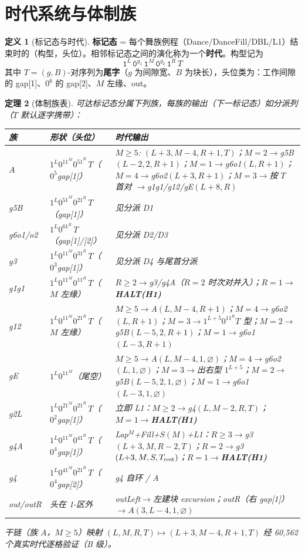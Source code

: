 \documentclass[11pt]{ctexart}
\newtheorem{theorem}{定理}[section]
\theoremstyle{definition}
\newtheorem{definition}[theorem]{定义}
\begin{document}
\section{时代系统与体制族}

\begin{definition}[标记态与时代]\label{def:era}
\textbf{标记态} = 每个舞族例程（Dance/DanceFill/DBL/L1）结束时的（构型，头位）。相邻标记态之间的演化称为一个\textbf{时代}。构型记为
\[
\texttt{1}^{L}\,\texttt{0}^{g_1}\,\texttt{1}^{M}\,\texttt{0}^{g_2}\,\texttt{1}^{R}\,T
\]
其中 $T=(g,B)$-对序列为\textbf{尾字}（$g$ 为间隙宽、$B$ 为块长），头位类为：工作间隙的 gap[1]、$0^6$ 的 gap[2]、$M$ 左缘、out。
\end{definition}

\begin{theorem}[体制族表]\label{thm:regime}
可达标记态分属下列族，每族的输出（下一标记态）如分派列（$T$ 默认逐字携带）：

\begin{center}\small
\begin{tabular}{llp{8.6cm}}
\toprule
族 & 形状（头位） & 时代输出\\
\midrule
$A$ & $1^L0^11^M0^51^R\,T$（$0^5$gap[1]） & $M\ge5$: $(L{+}3,M{-}4,R{+}1,T)$；$M{=}2\to$g5B$(L{-}2,2,R{+}1)$；$M{=}1\to$g6o1$(L,R{+}1)$；$M{=}4\to$g6o2$(L{+}3,R{+}1)$；$M{=}3\to$按 $T$ 首对 $\to$g1g1/g12/gE$(L{+}8,R)$\\
g5B & $1^L0^51^M0^21^R\,T$（gap[1]） & 见分派 D1\\
g6o1/o2 & $1^L0^61^R\,T$（gap[1]/[2]） & 见分派 D2/D3\\
g3 & $1^L0^11^M0^31^R\,T$（$0^3$gap[1]） & 见分派 D4 与尾首分派\\
g1g1 & $1^L0^11^M0^11^R\,T$（$M$ 左缘） & $R\ge2\to$g3/g4A（$R{=}2$ 时次对并入）；$R{=}1\to$\textbf{HALT(H1)}\\
g12 & $1^L0^11^M0^21^R\,T$（$M$ 左缘） & $M\ge5\to$A$(L,M{-}4,R{+}1)$；$M{=}4\to$g6o2$(L,R{+}1)$；$M{=}3\to$$1^{L+5}0^11^RT$ 型；$M{=}2\to$g5B$(L{-}5,2,R{+}1)$；$M{=}1\to$g6o1$(L{-}3,R{+}1)$\\
gE & $1^L0^11^M$（尾空） & $M\ge5\to$A$(L,M{-}4,1,\varnothing)$；$M{=}4\to$g6o2$(L,1,\varnothing)$；$M{=}3\to$出右型 $1^{L+5}$；$M{=}2\to$g5B$(L{-}5,2,1,\varnothing)$；$M{=}1\to$g6o1$(L{-}3,1,\varnothing)$\\
g2L & $1^L0^21^M0^21^R\,T$（$0^2$gap[1]） & 立即 L1：$M\ge2\to$g4$(L,M{-}2,R,T)$；$M{=}1\to$\textbf{HALT(H1)}\\
g4A & $1^L0^11^M0^41^R\,T$（$0^4$gap[1]） & Lap$^M$+Fill+$S(M)$+L1：$R\ge3\to$g3$(L{+}3,M,R{-}2,T)$；$R{=}2\to$g3$(L{+}3,M,S,T_{\rm rest})$；$R{=}1\to$\textbf{HALT(H1)}\\
g4 & $1^L0^41^M0^21^R\,T$（$0^4$gap[2]） & g4 自环 / A\\
out/outR & 头在 1-区外 & outLeft$\to$左建块 excursion；outR（右 gap[1]）$\to A(3,L{-}4,1,\varnothing)$\\
\bottomrule
\end{tabular}
\end{center}
干链（族 $A$，$M\ge5$）映射 $(L,M,R,T)\mapsto(L{+}3,M{-}4,R{+}1,T)$ 经 60{,}562 个真实时代逐格验证（B 级）。
\end{theorem}
\end{document}
